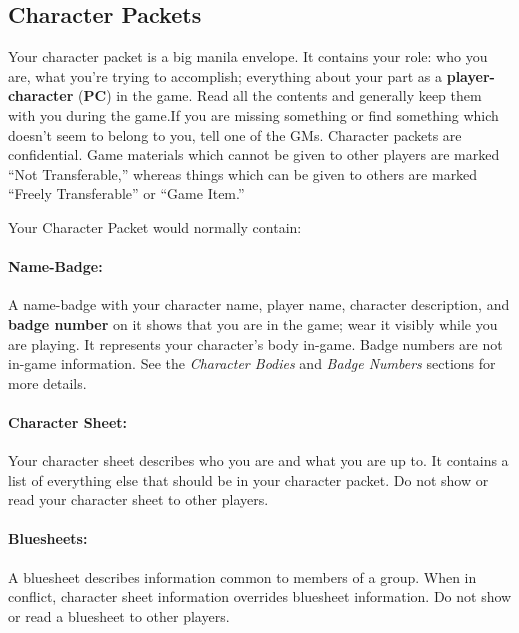 \documentclass[sheet]{GL2020}
\begin{document}
\subsection{Character Packets}

Your character packet is a big manila envelope.  It contains your role: who you are, what you're trying to accomplish; everything about your part as a {\bf player-character} ({\bf PC}) in the game. Read all the contents and generally keep them with you during the game.If you are missing something or find something which doesn't seem to belong to you, tell one of the GMs.  Character packets are confidential. Game materials which cannot be given to other players are marked ``Not Transferable,'' whereas things which can be given to others are marked ``Freely Transferable'' or ``Game Item.''

Your Character Packet would normally contain:

\paragraph{Name-Badge:} A name-badge with your character name, player name, character description, and {\bf badge number} on it shows that you are in the game; wear it visibly while you are playing.  It represents your character's body in-game.  Badge numbers are not in-game information. See the \emph{Character Bodies} and \emph{Badge Numbers} sections for more details.

\paragraph{Character Sheet:} Your character sheet describes who you are and what you are up to.  It contains a list of everything else that should be in your character packet. Do not show or read your character sheet to other players.

\paragraph{Bluesheets:} A bluesheet describes information common to members of a group.  When in conflict, character sheet information overrides bluesheet information. Do not show or read a bluesheet to other players.
\end{document}
